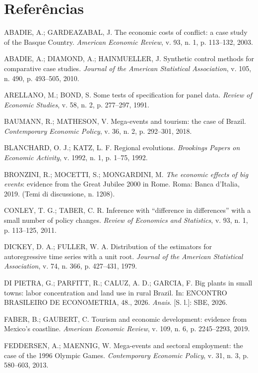\documentclass[12pt,a4paper]{article}
\begin{document}
\section*{Referências}
\begin{singlespace}\small
\setlength{\parindent}{0pt}\setlength{\parskip}{5pt}\raggedright

ABADIE, A.; GARDEAZABAL, J. The economic costs of conflict: a case study of the Basque Country.
\textit{American Economic Review}, v. 93, n. 1, p. 113--132, 2003.

ABADIE, A.; DIAMOND, A.; HAINMUELLER, J. Synthetic control methods for comparative case studies.
\textit{Journal of the American Statistical Association}, v. 105, n. 490, p. 493--505, 2010.

ARELLANO, M.; BOND, S. Some tests of specification for panel data. \textit{Review of Economic
Studies}, v. 58, n. 2, p. 277--297, 1991.

BAUMANN, R.; MATHESON, V. Mega-events and tourism: the case of Brazil. \textit{Contemporary Economic
Policy}, v. 36, n. 2, p. 292--301, 2018.

BLANCHARD, O. J.; KATZ, L. F. Regional evolutions. \textit{Brookings Papers on Economic Activity},
v. 1992, n. 1, p. 1--75, 1992.

BRONZINI, R.; MOCETTI, S.; MONGARDINI, M. \textit{The economic effects of big events}: evidence from
the Great Jubilee 2000 in Rome. Roma: Banca d'Italia, 2019. (Temi di discussione, n. 1208).

CONLEY, T. G.; TABER, C. R. Inference with ``difference in differences'' with a small number of
policy changes. \textit{Review of Economics and Statistics}, v. 93, n. 1, p. 113--125, 2011.

DICKEY, D. A.; FULLER, W. A. Distribution of the estimators for autoregressive time series with a unit
root. \textit{Journal of the American Statistical Association}, v. 74, n. 366, p. 427--431, 1979.

DI PIETRA, G.; PARFITT, R.; CALUZ, A. D.; GARCIA, F. Big plants in small towns: labor concentration
and land use in rural Brazil. In: ENCONTRO BRASILEIRO DE ECONOMETRIA, 48., 2026. \textit{Anais}.
[S. l.]: SBE, 2026.

FABER, B.; GAUBERT, C. Tourism and economic development: evidence from Mexico's coastline.
\textit{American Economic Review}, v. 109, n. 6, p. 2245--2293, 2019.

FEDDERSEN, A.; MAENNIG, W. Mega-events and sectoral employment: the case of the 1996 Olympic Games.
\textit{Contemporary Economic Policy}, v. 31, n. 3, p. 580--603, 2013.


\end{singlespace}
\end{document}
